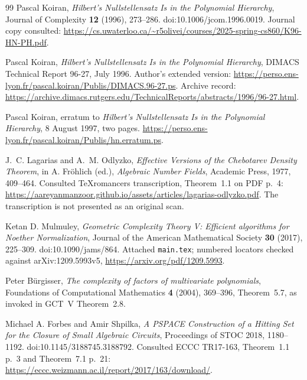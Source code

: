 \documentclass[11pt,a4paper]{article}
\begin{document}
\begin{thebibliography}{99}
Pascal Koiran, \emph{Hilbert's Nullstellensatz Is in the Polynomial
Hierarchy}, Journal of Complexity \textbf{12} (1996), 273--286.
doi:10.1006/jcom.1996.0019.
Journal copy consulted:
\url{https://cs.uwaterloo.ca/~r5olivei/courses/2025-spring-cs860/K96-HN-PH.pdf}.



Pascal Koiran, \emph{Hilbert's Nullstellensatz Is in the Polynomial
Hierarchy}, DIMACS Technical Report 96-27, July 1996.
Author's extended version:
\url{https://perso.ens-lyon.fr/pascal.koiran/Publis/DIMACS.96-27.ps}.
Archive record:
\url{https://archive.dimacs.rutgers.edu/TechnicalReports/abstracts/1996/96-27.html}.



Pascal Koiran, erratum to \emph{Hilbert's Nullstellensatz Is in the
Polynomial Hierarchy}, 8 August 1997, two pages.
\url{https://perso.ens-lyon.fr/pascal.koiran/Publis/hn.erratum.ps}.



J.~C. Lagarias and A.~M. Odlyzko, \emph{Effective Versions of the
Chebotarev Density Theorem}, in A. Fr\"ohlich (ed.), \emph{Algebraic
Number Fields}, Academic Press, 1977, 409--464.
Consulted TeXromancers transcription, Theorem~1.1 on PDF p.~4:
\url{https://aareyanmanzoor.github.io/assets/articles/lagarias-odlyzko.pdf}.
The transcription is not presented as an original scan.



Ketan D. Mulmuley, \emph{Geometric Complexity Theory V: Efficient
algorithms for Noether Normalization}, Journal of the American
Mathematical Society \textbf{30} (2017), 225--309.
doi:10.1090/jams/864.
Attached \texttt{main.tex}; numbered locators checked against
arXiv:1209.5993v5, \url{https://arxiv.org/pdf/1209.5993}.



Peter B\"urgisser, \emph{The complexity of factors of multivariate
polynomials}, Foundations of Computational Mathematics \textbf{4}
(2004), 369--396, Theorem~5.7, as invoked in GCT~V Theorem~2.8.



Michael A. Forbes and Amir Shpilka, \emph{A PSPACE Construction of a
Hitting Set for the Closure of Small Algebraic Circuits}, Proceedings
of STOC 2018, 1180--1192. doi:10.1145/3188745.3188792.
Consulted ECCC TR17-163, Theorem~1.1 p.~3 and Theorem~7.1 p.~21:
\url{https://eccc.weizmann.ac.il/report/2017/163/download/}.




\end{thebibliography}
\end{document}
